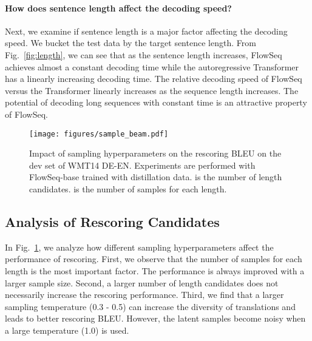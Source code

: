 \documentclass[11pt,a4paper]{article}
\begin{document}
\paragraph{How does sentence length affect the decoding speed?}
Next, we examine if sentence length is a major factor affecting the decoding speed. We bucket the test data by the target sentence length. From Fig.~\ref{fig:length}, we can see that as the sentence length increases, FlowSeq achieves almost a constant decoding time while the autoregressive Transformer has a linearly increasing decoding time. The relative decoding speed of FlowSeq versus the Transformer linearly increases as the sequence length increases. The potential of decoding long sequences with constant time is an attractive property of FlowSeq.

\begin{figure}[tb]
  \centering
  \texttt{[image: figures/sample\_beam.pdf]}
  \caption{Impact of sampling hyperparameters on the rescoring BLEU on the dev set of WMT14 DE-EN. Experiments are performed with FlowSeq-base trained with distillation data.  is the number of length candidates.  is the number of samples for each length.} \label{fig:rerank}
  \vspace{-4mm}
\end{figure}
\subsection{Analysis of Rescoring Candidates}\label{subsec:rescore}
In Fig.~\ref{fig:rerank}, we analyze how different sampling hyperparameters affect the performance of rescoring. First, we observe that the number of samples  for each length is the most important factor. The performance is always improved with a larger sample size. Second, a larger number of length candidates does not necessarily increase the rescoring performance. Third, we find that a larger sampling temperature (0.3 - 0.5) can increase the diversity of translations and leads to better rescoring BLEU. However, the latent samples become noisy when a large temperature (1.0) is used.
\end{document}
